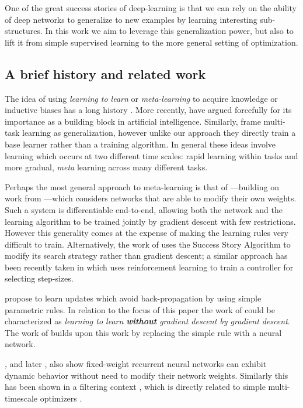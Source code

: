 \documentclass{article}
\begin{document}
One of the great success stories of deep-learning is that we can rely on the
ability of deep networks to generalize to new examples by learning interesting
sub-structures. In this work we aim to leverage this generalization power, but
also to lift it from simple supervised learning to the more general setting of
optimization.

\subsection{A brief history and related work}

The idea of using \emph{learning to learn} or \emph{meta-learning} to acquire
knowledge or inductive biases has a long history \citep{thrun:1998}. More
recently, \cite{lake:2016} have argued forcefully for its importance as a
building block in artificial intelligence. Similarly, \cite{santoro:2016}
frame multi-task learning as generalization, however unlike our approach they
directly train a base learner rather than a training algorithm.  In general
these ideas involve learning which occurs at two different time scales: rapid
learning within tasks and more gradual, \emph{meta} learning across many
different tasks.

Perhaps the most general approach to meta-learning is that of
\cite{schmidhuber:1992, schmidhuber:1993}---building on work from
\citep{schmidhuber:1987}---which considers networks that are able to modify
their own weights. Such a system is differentiable end-to-end, allowing both
the network and the learning algorithm to be trained jointly by gradient
descent with few restrictions.  However this generality comes at the expense of
making the learning rules very difficult to train.  Alternatively, the work of
\cite{schmidhuber:1997} uses the Success Story Algorithm to modify its search
strategy rather than gradient descent; a similar approach has been recently
taken in \cite{daniel:2016} which uses reinforcement learning to train a
controller for selecting step-sizes.

\cite{bengio:1990, bengio:1995} propose to learn updates which avoid
back-propagation by using simple parametric rules. In relation to the focus of
this paper the work of \citeauthor{bengio:1990} could be characterized as
\emph{learning to learn \textbf{without} gradient descent by gradient descent}.
The work of \cite{runarsson:2000} builds upon this work by replacing the simple
rule with a neural network.

\cite{cotter:1990}, and later \cite{younger:1999}, also show fixed-weight
recurrent neural networks can exhibit dynamic behavior without need to modify
their network weights. Similarly this has been shown in a filtering context
\citep[e.g.][]{feldkamp:1998}, which is directly related to simple
multi-timescale optimizers \citep{sutton:1992, schraudolph:1999}.
\end{document}

